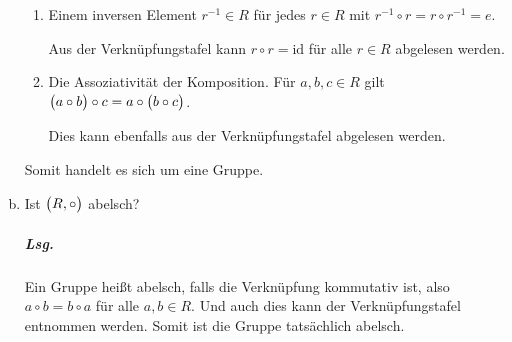 \documentclass{scrreprt}
\begin{document}
\begin{enumerate}[(a)]
\begin{enumerate}[(1)]
  \item Einem inversen Element $r^{-1} \in R$ für jedes $r \in R$ mit
    $r^{-1} \circ r = r \circ r^{-1} = e$.

    Aus der Verknüpfungstafel kann $r \circ r = \text{id}$ für alle $r \in R$
    abgelesen werden.

  \item Die Assoziativität der Komposition.
    Für $a, b, c \in R$ gilt
    $\qty\big(a \circ b) \circ c = a \circ \qty\big(b \circ c)$.

    Dies kann ebenfalls aus der Verknüpfungstafel abgelesen werden.
  \end{enumerate}

  Somit handelt es sich um eine Gruppe.

\item Ist $\qty\big(R, \circ)$ abelsch?

  \subparagraph{Lsg.} Ein Gruppe heißt abelsch, falls die Verknüpfung
  kommutativ ist, also $a \circ b = b \circ a$ für alle $a, b \in R$.
  Und auch dies kann der Verknüpfungstafel entnommen werden.
  Somit ist die Gruppe tatsächlich abelsch.
\end{enumerate}
\end{document}
